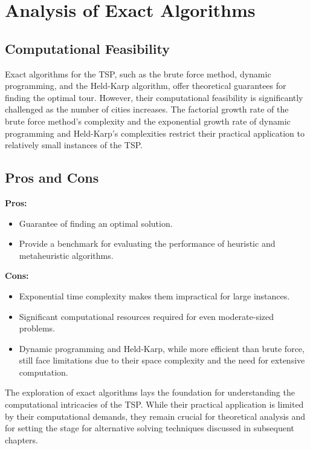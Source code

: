 \section{Analysis of Exact Algorithms}

\subsection{Computational Feasibility}

Exact algorithms for the TSP, such as the brute force method, dynamic programming, and the Held-Karp algorithm, offer theoretical guarantees for finding the optimal tour. However, their computational feasibility is significantly challenged as the number of cities increases. The factorial growth rate of the brute force method's complexity and the exponential growth rate of dynamic programming and Held-Karp's complexities restrict their practical application to relatively small instances of the TSP.

\subsection{Pros and Cons}

\textbf{Pros:}
\begin{itemize}
	\item Guarantee of finding an optimal solution.
	\item Provide a benchmark for evaluating the performance of heuristic and metaheuristic algorithms.
\end{itemize}

\textbf{Cons:}
\begin{itemize}
	\item Exponential time complexity makes them impractical for large instances.
	\item Significant computational resources required for even moderate-sized problems.
	\item Dynamic programming and Held-Karp, while more efficient than brute force, still face limitations due to their space complexity and the need for extensive computation.
\end{itemize}

The exploration of exact algorithms lays the foundation for understanding the computational intricacies of the TSP. While their practical application is limited by their computational demands, they remain crucial for theoretical analysis and for setting the stage for alternative solving techniques discussed in subsequent chapters.